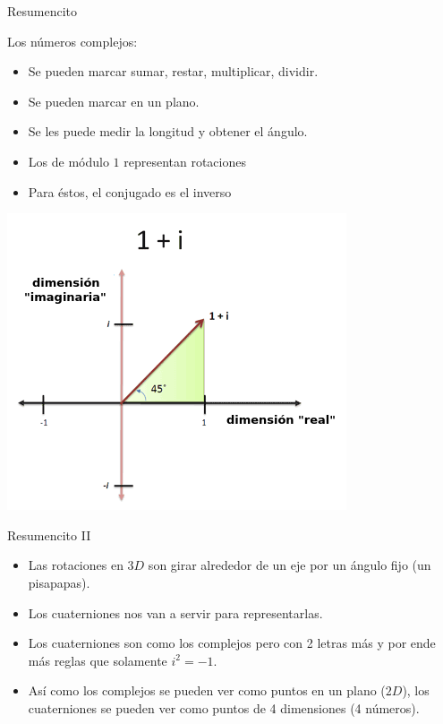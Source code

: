 \documentclass[10pt]{beamer}
\begin{document}
\begin{frame}{Resumencito}

Los números complejos:
\begin{itemize}
	\item Se pueden marcar sumar, restar, multiplicar, dividir.
	\item Se pueden marcar en un plano.
	\item Se les puede medir la longitud y obtener el ángulo.
	\item Los de módulo $1$ representan rotaciones
	\item Para éstos, el conjugado es el inverso
\end{itemize}

\includegraphics[scale=0.4]{1plusi.png}

\end{frame}

\begin{frame}{Resumencito II}
\begin{itemize}
	\item Las rotaciones en $3D$ son girar alrededor de un eje por un ángulo fijo (un pisapapas).
	\item Los cuaterniones nos van a servir para representarlas.
	\item Los cuaterniones son como los complejos pero con 2 letras más y por ende más reglas que solamente $i^2=-1$.%
	\item Así como los complejos se pueden ver como puntos en un plano ($2D$), los cuaterniones se pueden ver como puntos de 4 dimensiones (4 números).
\end{itemize}
\end{frame}
\end{document}
